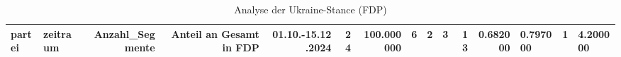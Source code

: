 \begin{table}
\caption{Analyse der Ukraine-Stance (FDP)}
\label{tab:meine_tabelle}
\begin{tabular}{llrrrrrrrrrr}
\toprule
partei & zeitraum & Anzahl_Segmente & Anteil an Gesamt in %
\midrule
FDP & 01.10.-15.12.2024 & 24 & 100.000000 & 6 & 2 & 3 & 13 & 0.682000 & 0.797000 & 1 & 4.200000 \\
\bottomrule
\end{tabular}
\end{table}

